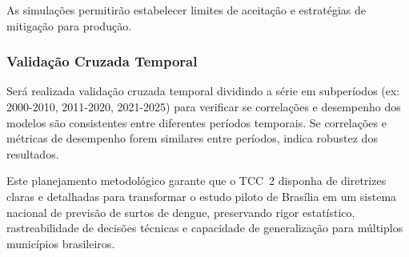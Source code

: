 As simulações permitirão estabelecer limites de aceitação e estratégias de mitigação para produção.

\subsubsection{Validação Cruzada Temporal}

Será realizada validação cruzada temporal dividindo a série em subperíodos (ex: 2000-2010, 2011-2020, 2021-2025) para verificar se correlações e desempenho dos modelos são consistentes entre diferentes períodos temporais. Se correlações e métricas de desempenho forem similares entre períodos, indica robustez dos resultados.

Este planejamento metodológico garante que o TCC~2 disponha de diretrizes claras e detalhadas para transformar o estudo piloto de Brasília em um sistema nacional de previsão de surtos de dengue, preservando rigor estatístico, rastreabilidade de decisões técnicas e capacidade de generalização para múltiplos municípios brasileiros.
